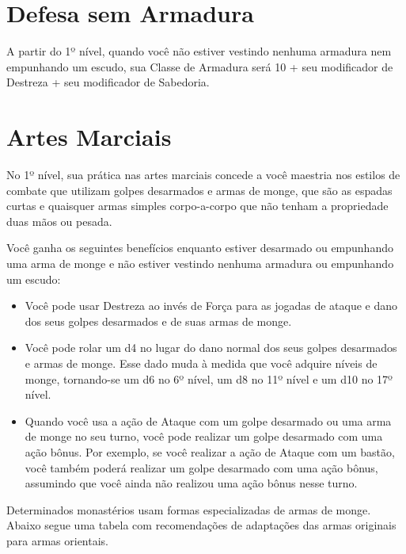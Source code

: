 \begin{multicols}{2}

\section*{Defesa sem Armadura}%

A partir do 1º nível, quando você não estiver vestindo nenhuma armadura nem
empunhando um escudo, sua Classe de Armadura será 10 + seu modificador de
Destreza + seu modificador de Sabedoria.

\section*{Artes Marciais}%

No 1º nível, sua prática nas artes marciais concede a você maestria nos estilos
de combate que utilizam golpes desarmados e armas de monge, que são as espadas
curtas e quaisquer armas simples corpo-a-corpo que não tenham a propriedade duas
mãos ou pesada.

Você ganha os seguintes benefícios enquanto estiver desarmado ou empunhando uma
arma de monge e não estiver vestindo nenhuma armadura ou empunhando um escudo:

\begin{itemize}
    \item Você pode usar Destreza ao invés de Força para as jogadas de ataque e
        dano dos seus golpes desarmados e de suas armas de monge.
    \item Você pode rolar um d4 no lugar do dano normal dos seus golpes
        desarmados e armas de monge. Esse dado muda à medida que você adquire
        níveis de monge, tornando-se um d6 no 6º nível, um d8 no 11º nível e um
        d10 no 17º nível.
    \item Quando você usa a ação de Ataque com um golpe desarmado ou uma arma de
        monge no seu turno, você pode realizar um golpe desarmado com uma ação
        bônus. Por exemplo, se você realizar a ação de Ataque com um bastão,
        você também poderá realizar um golpe desarmado com uma ação bônus,
        assumindo que você ainda não realizou uma ação bônus nesse turno.
\end{itemize}

Determinados monastérios usam formas especializadas de armas de monge. Abaixo
segue uma tabela com recomendações de adaptações das armas originais para armas
orientais.


\end{multicols}
